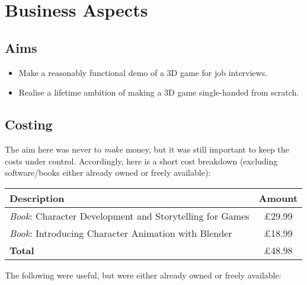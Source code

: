 \chapter{Business Aspects}

\section{Aims}

\begin{itemize}

\item Make a reasonably functional demo of a 3D game for job interviews.
\item Realise a lifetime ambition of making a 3D game single-handed from scratch.

\end{itemize}

\section{Costing}

The aim here was never to \emph{make} money, but it was still important to keep the costs under control. Accordingly, here is a short cost breakdown (excluding software/books either already owned or freely available):

\vspace{\baselineskip}

\begin{center}
\begin{tabular}{l|c}
\textbf{Description} & \textbf{Amount} \\
\hline
\emph{Book}: Character Development and Storytelling for Games & \pounds 29.99 \\
\emph{Book}: Introducing Character Animation with Blender & \pounds 18.99 \\
\textbf{Total} & \pounds 48.98
\end{tabular}
\end{center}

\vspace{\baselineskip}

\noindent The following were useful, but were either already owned or freely available:

